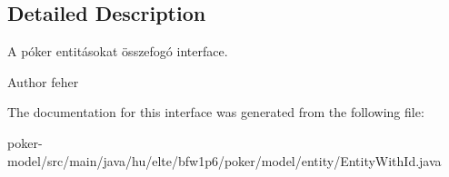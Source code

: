 \subsection{Detailed Description}
A póker entitásokat összefogó interface. \begin{DoxyAuthor}{Author}
feher 
\end{DoxyAuthor}


The documentation for this interface was generated from the following file\+:\begin{DoxyCompactItemize}
\item 
poker-\/model/src/main/java/hu/elte/bfw1p6/poker/model/entity/Entity\+With\+Id.\+java\end{DoxyCompactItemize}
